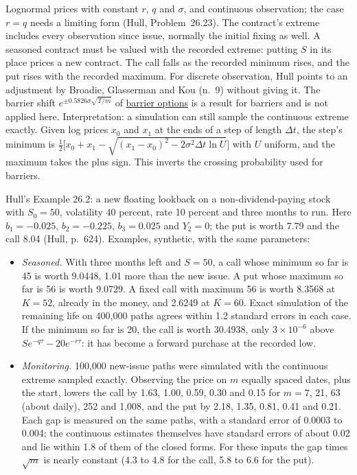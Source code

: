 \begin{qfmethod}
 Lognormal prices with constant $r$, $q$ and $\sigma$, and continuous observation; the case $r=q$ needs a limiting form (Hull, Problem~26.23). The contract's extreme includes every observation since issue, normally the initial fixing as well. A seasoned contract must be valued with the recorded extreme: putting $S$ in its place prices a new contract. The call falls as the recorded minimum rises, and the put rises with the recorded maximum. For discrete observation, Hull points to an adjustment by Broadie, Glasserman and Kou (n.~9) without giving it. The barrier shift $e^{\pm0.5826\sigma\sqrt{T/m}}$ of \hyperref[meth:barrier-option-valuation]{barrier options} is a result for barriers and is not applied here. Interpretation: a simulation can still sample the continuous extreme exactly. Given log prices $x_0$ and $x_1$ at the ends of a step of length $\Delta t$, the step's minimum is $\tfrac12\bigl[x_0+x_1-\sqrt{(x_1-x_0)^2-2\sigma^2\Delta t\ln U}\bigr]$ with $U$ uniform, and the maximum takes the plus sign. This inverts the crossing probability used for barriers.

 Hull's Example 26.2: a new floating lookback on a non-dividend-paying stock with $S_0=50$, volatility 40 percent, rate 10 percent and three months to run. Here $b_1=-0.025$, $b_2=-0.225$, $b_3=0.025$ and $Y_2=0$; the put is worth 7.79 and the call 8.04 (Hull, p.~624). Examples, synthetic, with the same parameters:
\begin{itemize}
\item \emph{Seasoned.} With three months left and $S=50$, a call whose minimum so far is 45 is worth 9.0448, 1.01 more than the new issue. A put whose maximum so far is 56 is worth 9.0729. A fixed call with maximum 56 is worth 8.3568 at $K=52$, already in the money, and 2.6249 at $K=60$. Exact simulation of the remaining life on 400{,}000 paths agrees within 1.2 standard errors in each case. If the minimum so far is 20, the call is worth 30.4938, only $3\times10^{-6}$ above $Se^{-q\tau}-20e^{-r\tau}$: it has become a forward purchase at the recorded low.
\item \emph{Monitoring.} 100{,}000 new-issue paths were simulated with the continuous extreme sampled exactly. Observing the price on $m$ equally spaced dates, plus the start, lowers the call by 1.63, 1.00, 0.59, 0.30 and 0.15 for $m=7$, 21, 63 (about daily), 252 and 1{,}008, and the put by 2.18, 1.35, 0.81, 0.41 and 0.21. Each gap is measured on the same paths, with a standard error of 0.0003 to 0.004; the continuous estimates themselves have standard errors of about 0.02 and lie within 1.8 of them of the closed forms. For these inputs the gap times $\sqrt m$ is nearly constant (4.3 to 4.8 for the call, 5.8 to 6.6 for the put).
\end{itemize}


\end{qfmethod}
